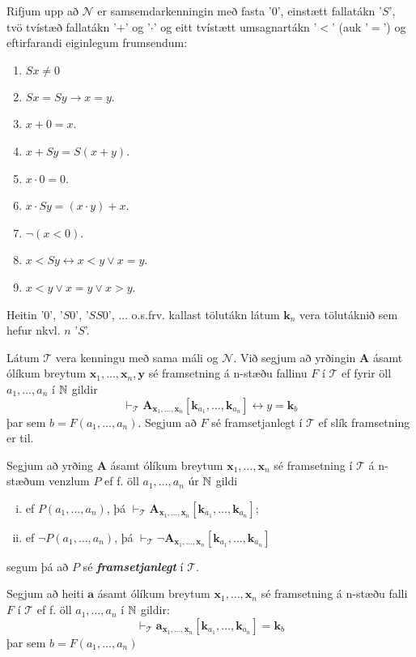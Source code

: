 \documentclass[12pt]{book}
\newcommand{\cT}{\mathcal{T}}
\newcommand{\cN}{\mathcal{N}}
\newcommand{\mb}[1]{\mathbf{#1}}
\newcommand{\bA}{\mathbf{A}}
\newcommand{\ba}{\mathbf{a}}
\newcommand{\bx}{\mathbf{x}}
\newcommand{\bk}{\mathbf{k}}
\newcommand{\bxxn}{\bx_1, \dotsc, \bx_n}
\newcommand{\aan}{a_1, \dotsc, a_n}
\newcommand{\emphs}[1]{\textbf{\emph{#1}}}
\begin{document}
Rifjum upp að $\cN$ er samsemdarkenningin með fasta '$0$', einstætt
fallatákn '$S$', tvö tvístæð fallatákn '$+$' og '$\cdot$' og
eitt tvístætt umsagnartákn '$<$' (auk '$=$') og eftirfarandi eiginlegum
frumsendum:

\begin{enumerate}[label=\textbf{N\arabic*}]
\item  \( Sx \neq 0\)
\item  $ Sx = Sy \rightarrow x = y$.
\item  $ x + 0 = x$.
\item  $ x + Sy = S(x+y)$.
\item  $ x \cdot 0 = 0$.
\item  $ x \cdot Sy = (x \cdot y) + x$.
\item  $ \lnot (x < 0)$.
\item  $ x < Sy \leftrightarrow x < y \vee x = y$.
\item  $ x < y \vee x = y \vee x > y$.
\end{enumerate}

Heitin '$0$', '$S0$', '$SS0$', $\dotsc$ o.s.frv. kallast
tölutákn látum $\mb{k}_n$ vera tölutáknið sem hefur nkvl. $n$ '$S$'.

\begin{skgr}
  Látum $\cT$ vera kenningu með sama máli og $\cN$. Við segjum
  að yrðingin $\bA$ ásamt ólíkum breytum 
  $\bx_1, \dotsc, \bx_n ,\mathbf{y}$ sé framsetning á n-stæðu fallinu
 $F$ í $\cT$ ef fyrir öll $a_1, \dotsc, a_n$ í $\mathbb{N}$ gildir
 \[ \vdash_{\cT} \bA_{\bx_1, \dotsc, \bx_n} [ \bk_{a_1}, \dotsc, \bk_{a_n}] \leftrightarrow y = \bk_b \]
 þar sem $ b = F( a_1, \dotsc, a_n)$. Segjum að $F$ sé framsetjanlegt í
 $\cT$ ef slík framsetning er til.

 Segjum að yrðing $\bA$ ásamt ólíkum breytum $\bxxn$ sé framsetning í $\cT$
 á n-stæðum venzlum $P$ ef f. öll $\aan$ úr $\mathbb{N}$ gildi
 \begin{enumerate}[(i)]
 \item  ef $P(\aan)$, þá $\vdash_{\cT} \bA_{\bxxn}[\bk_{a_1}, \dotsc, \bk_{a_n}]$;
 \item  ef $\lnot P(\aan)$, þá $\vdash_{\cT} \lnot \bA_{\bxxn}[\bk_{a_1}, \dotsc, \bk_{a_n}]$
 \end{enumerate}
 segum þá að $P$ sé \emphs{framsetjanlegt} í $\cT$.

 Segjum að heiti $\ba$ ásamt ólíkum breytum $\bxxn$ sé framsetning á 
 n-stæðu falli $F$ í $\cT$ ef f. öll $\aan$ í $\mathbb{N}$
 gildir:
 \[ \vdash_{\cT} \ba_{\bxxn}[\bk_{a_1}, \dotsc, \bk_{a_n}] = \bk_b \]
 þar sem $b = F(\aan)$
\end{skgr}
\end{document}
